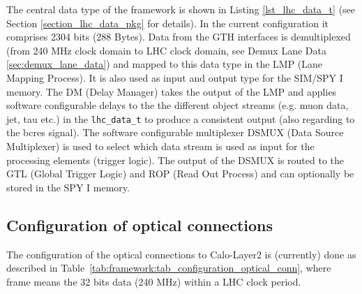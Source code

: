 The central data type of the framework is shown in Listing \ref{lst_lhc_data_t} (see Section \ref{section_lhc_data_pkg} for details). In the current configuration it comprises 
2304 bits (288 Bytes). Data from the GTH interfaces is demultiplexed (from 240 MHz clock domain to LHC clock domain, see Demux Lane Data \ref{sec:demux_lane_data}) and mapped to this data type in the LMP (Lane Mapping Process). It is also used as input and output type for the SIM/SPY I memory. 
The DM (Delay Manager) takes the output of the LMP and applies software configurable delays to the the different object streams (e.g. muon data, jet, tau etc.) in the \texttt{lhc\_data\_t} 
to produce a consistent output (also regarding to the bcres signal). The software configurable multiplexer DSMUX (Data Source Multiplexer) is used to select which data stream is used as 
input for the processing elements (trigger logic). The output of the DSMUX is routed to the GTL (Global Trigger Logic) and ROP (Read Out Process) and can optionally be stored in the SPY I memory.

\subsection{Configuration of optical connections} \label{sec:sec_configuration_optical_conn}
The configuration of the optical connections to Calo-Layer2 is (currently) done as described in Table~\ref{tab:framework:tab_configuration_optical_conn}, where
frame means the 32 bits data (240 MHz) within a LHC clock period. 

